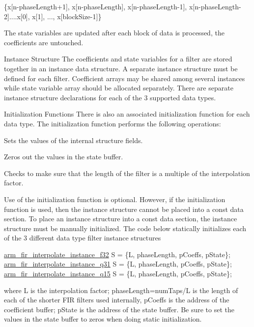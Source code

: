 \begin{DoxyParagraph}{}

\begin{DoxyPre}   
   \{x[n-phaseLength+1], x[n-phaseLength], x[n-phaseLength-1], x[n-phaseLength-2]....x[0], x[1], ..., x[blockSize-1]\}   
\end{DoxyPre}
 The state variables are updated after each block of data is processed, the coefficients are untouched.
\end{DoxyParagraph}
\begin{DoxyParagraph}{Instance Structure }
The coefficients and state variables for a filter are stored together in an instance data structure. A separate instance structure must be defined for each filter. Coefficient arrays may be shared among several instances while state variable array should be allocated separately. There are separate instance structure declarations for each of the 3 supported data types.
\end{DoxyParagraph}
\begin{DoxyParagraph}{Initialization Functions }
There is also an associated initialization function for each data type. The initialization function performs the following operations\-:
\begin{DoxyItemize}
\item Sets the values of the internal structure fields.
\item Zeros out the values in the state buffer.
\item Checks to make sure that the length of the filter is a multiple of the interpolation factor.
\end{DoxyItemize}
\end{DoxyParagraph}
\begin{DoxyParagraph}{}
Use of the initialization function is optional. However, if the initialization function is used, then the instance structure cannot be placed into a const data section. To place an instance structure into a const data section, the instance structure must be manually initialized. The code below statically initializes each of the 3 different data type filter instance structures 
\begin{DoxyPre}   
\hyperlink{structarm__fir__interpolate__instance__f32}{arm\_fir\_interpolate\_instance\_f32} S = \{L, phaseLength, pCoeffs, pState\};   
\hyperlink{structarm__fir__interpolate__instance__q31}{arm\_fir\_interpolate\_instance\_q31} S = \{L, phaseLength, pCoeffs, pState\};   
\hyperlink{structarm__fir__interpolate__instance__q15}{arm\_fir\_interpolate\_instance\_q15} S = \{L, phaseLength, pCoeffs, pState\};   
\end{DoxyPre}
 where {\ttfamily L} is the interpolation factor; {\ttfamily phase\-Length=num\-Taps/\-L} is the length of each of the shorter F\-I\-R filters used internally, {\ttfamily p\-Coeffs} is the address of the coefficient buffer; {\ttfamily p\-State} is the address of the state buffer. Be sure to set the values in the state buffer to zeros when doing static initialization.
\end{DoxyParagraph}
